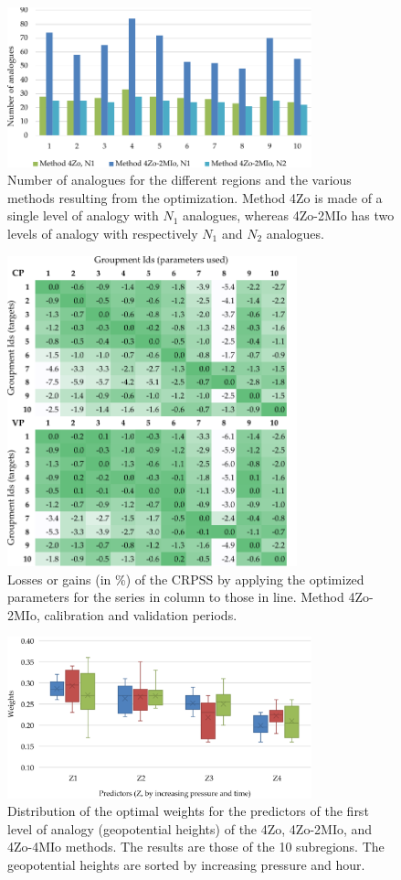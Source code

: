 \documentclass[review]{elsarticle}
\begin{document}
\begin{figure}[t]
	\centerline{\includegraphics[width=8.8cm]{figures/fig07.pdf}}
	\caption{Number of analogues for the different regions and the various methods resulting from the optimization. Method 4Zo is made of a single level of analogy with $N_{1}$ analogues, whereas 4Zo-2MIo has two levels of analogy with respectively $N_{1}$ and $N_{2}$ analogues.}
	\label{fig:figure_nb_analogs}
\end{figure}

\begin{figure}[t]
	\centerline{\includegraphics[width=8.4cm]{figures/fig08.pdf}}
	\caption{Losses or gains (in \%) of the CRPSS by applying the optimized parameters for the series in column to those in line. Method 4Zo-2MIo, calibration and validation periods.}
	\label{fig:crossing_4Zo-2MIo}
\end{figure}

\begin{figure}[t]
	\centerline{\includegraphics[width=8.8cm]{figures/fig09.pdf}}
	\caption{Distribution of the optimal weights for the predictors of the first level of analogy (geopotential heights) of the 4Zo, 4Zo-2MIo, and 4Zo-4MIo methods. The results are those of the 10 subregions. The geopotential heights are sorted by increasing pressure and hour.}
	\label{fig:levels_weights_average}
\end{figure}
\end{document}
